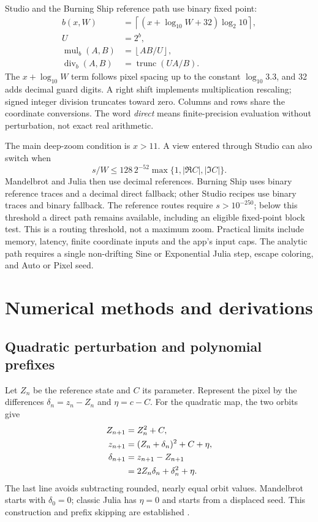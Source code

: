 \documentclass[11pt,a4paper]{article}
\numberwithin{equation}{section}
\newcommand{\abs}[1]{\lvert#1\rvert}
\begin{document}
Studio and the Burning Ship reference path use binary fixed point:
\begin{align}
  b(x,W)&=\left\lceil(x+\log_{10}W+32)\log_2 10\right\rceil,\\
  U&=2^b,\\
  \operatorname{mul}_b(A,B)&=\left\lfloor AB/U\right\rfloor,\\
  \operatorname{div}_b(A,B)&=\operatorname{trunc}(UA/B).
\end{align}
The \(x+\log_{10}W\) term follows pixel spacing up to the constant
\(\log_{10}3.3\), and 32 adds decimal guard digits. A right shift
implements multiplication rescaling; signed integer division truncates
toward zero. Columns and rows share the coordinate conversions.
The word \emph{direct} means finite-precision evaluation without
perturbation, not exact real arithmetic.

The main deep-zoom condition is \(x>11\). A view entered through Studio
can also switch when
\begin{equation}
  s/W\le128\,2^{-52}\max\{1,\abs{\Re C},\abs{\Im C}\}.
\end{equation}
Mandelbrot and Julia then use decimal references. Burning Ship uses
binary reference traces and a decimal direct fallback; other Studio
recipes use binary traces and binary fallback. The reference routes
require \(s>10^{-250}\); below this threshold a direct path remains
available, including an eligible fixed-point block test. This is a
routing threshold, not a maximum zoom. Practical limits include memory,
latency, finite coordinate inputs and the app's input caps.
The analytic path requires a single non-drifting Sine or Exponential
Julia step, escape coloring, and Auto or Pixel seed.

\section{Numerical methods and derivations}\label{sec:methods}

\subsection{Quadratic perturbation and polynomial prefixes}

Let \(Z_n\) be the reference state and \(C\) its parameter. Represent
the pixel by the differences \(\delta_n=z_n-Z_n\) and \(\eta=c-C\).
For the quadratic map, the two orbits give
\begin{align}
  Z_{n+1}&=Z_n^2+C,\\
  z_{n+1}&=(Z_n+\delta_n)^2+C+\eta,\\
  \delta_{n+1}
    &=z_{n+1}-Z_{n+1}\notag\\
    &=2Z_n\delta_n+\delta_n^2+\eta. \label{eq:quadratic-delta}
\end{align}
The last line avoids subtracting rounded, nearly equal orbit values.
Mandelbrot starts with \(\delta_0=0\); classic Julia has \(\eta=0\)
and starts from a displaced seed. This construction and prefix skipping
are established \cite{martin,khashin,heiland}.
\end{document}
